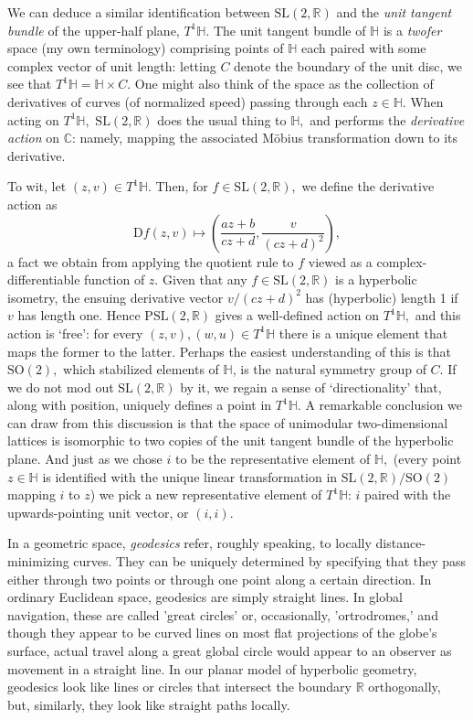 \documentclass[12pt, letterpaper, oneside]{book}
\newcommand{\C}{\mathbb{C}}
\newcommand{\Hyp}{\mathbb{H}}
\newcommand{\R}{\mathbb{R}}
\theoremstyle{plain}
\theoremstyle{definition}
\theoremstyle{remark}
\begin{document}
We can deduce a similar identification between $\mbox{SL}(2,\R)$ and the \textit{unit tangent bundle} of the upper-half plane, $T^1\mathbb{H}.$ The unit tangent bundle of $\mathbb{H}$ is a \textit{twofer} space (my own terminology) comprising points of $\mathbb{H}$ each paired with some complex vector of unit length: letting $C$ denote the boundary of the unit disc, we see that $T^1\mathbb{H} = \Hyp \times C.$  One might also think of the space as the collection of derivatives of curves (of normalized speed) passing through each $z \in \mathbb{H}.$ When acting on $T^1\Hyp,$ $\mbox{SL}(2,\R)$ does the usual thing to $\mathbb{H},$ and performs the \textit{derivative action} on $\C$: namely, mapping the associated M\"obius transformation down to its derivative.

To wit, let $(z, v) \in T^1\mathbb{H}.$ Then, for $f \in \mbox{SL}(2, \R),$ we define the derivative action as 
\[
\mbox{D}f(z,v) \mapsto (\frac{az + b}{cz + d}, \frac{v}{(cz + d)^2}),
\]
a fact we obtain from applying the quotient rule to $f$ viewed as a complex-differentiable function of $z.$ Given that any $f \in \mbox{SL}(2,\R)$ is a hyperbolic isometry, the ensuing derivative vector $v/(cz+d)^2$ has (hyperbolic) length 1 if $v$ has length one. Hence $\mbox{PSL}(2,\R)$ gives a well-defined action on $T^1\Hyp,$ and this action is `free': for every $(z,v), (w,u) \in T^1\Hyp$ there is a unique element that maps the former to the latter. Perhaps the easiest understanding of this is that $\mbox{SO}(2),$ which stabilized elements of $\Hyp$, is the natural symmetry group of $C.$ If we do not mod out $\mbox{SL}(2,\R)$ by it, we regain a sense of `directionality' that, along with position, uniquely defines a point in $T^1\Hyp.$ A remarkable conclusion we can draw from this discussion is that the space of unimodular two-dimensional lattices is isomorphic to two copies of the unit tangent bundle of the hyperbolic plane. And just as we chose $i$ to be the representative element of $\Hyp,$ (every point $z \in \Hyp$ is identified with the unique linear transformation in $\mbox{SL}(2, \R) / \mbox{SO}(2)$ mapping $i$ to $z$) we pick a new representative element of $T^1\Hyp$: $i$ paired with the upwards-pointing unit vector, or $(i,i).$  

In a geometric space, \textit{geodesics} refer, roughly speaking, to locally distance-minimizing curves. They can be uniquely determined by specifying that they pass either through two points or through one point along a certain direction. In ordinary Euclidean space, geodesics are simply straight lines. In global navigation, these are called 'great circles' or, occasionally, 'ortrodromes,' and though they appear to be curved lines on most flat projections of the globe's surface, actual travel along a great global circle would appear to an observer as movement in a straight line. In our planar model of hyperbolic geometry, geodesics look like lines or circles that intersect the boundary $\R$ orthogonally, but, similarly, they look like straight paths locally. 
\end{document}
